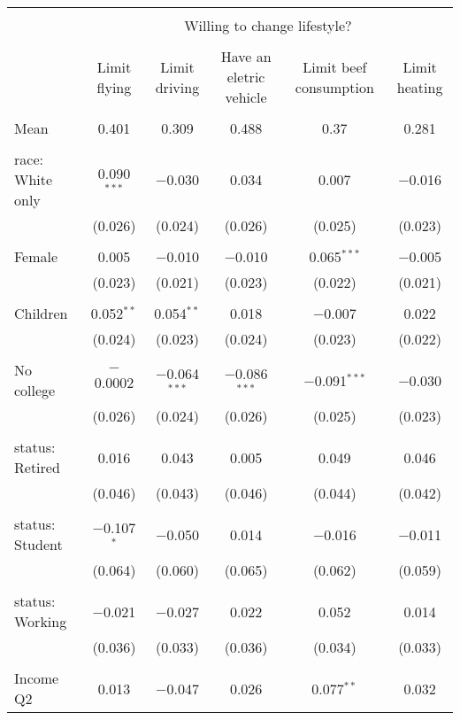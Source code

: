 
\begin{tabular}{@{\extracolsep{5pt}}lccccc} 
\\[-1.8ex]\hline 
\hline \\[-1.8ex] 
 & \multicolumn{5}{c}{Willing to change lifestyle?} \\ 
\cline{2-6} 
\\[-1.8ex] & Limit flying & Limit driving & Have an eletric vehicle & Limit beef consumption & Limit heating \\ 
\hline \\[-1.8ex] 
 Mean & 0.401 & 0.309 & 0.488 & 0.37 & 0.281  \\ \hline \\[-1.8ex] race: White only & 0.090$^{***}$ & $-$0.030 & 0.034 & 0.007 & $-$0.016 \\ 
  & (0.026) & (0.024) & (0.026) & (0.025) & (0.023) \\ 
  & & & & & \\ 
 Female & 0.005 & $-$0.010 & $-$0.010 & 0.065$^{***}$ & $-$0.005 \\ 
  & (0.023) & (0.021) & (0.023) & (0.022) & (0.021) \\ 
  & & & & & \\ 
 Children & 0.052$^{**}$ & 0.054$^{**}$ & 0.018 & $-$0.007 & 0.022 \\ 
  & (0.024) & (0.023) & (0.024) & (0.023) & (0.022) \\ 
  & & & & & \\ 
 No college & $-$0.0002 & $-$0.064$^{***}$ & $-$0.086$^{***}$ & $-$0.091$^{***}$ & $-$0.030 \\ 
  & (0.026) & (0.024) & (0.026) & (0.025) & (0.023) \\ 
  & & & & & \\ 
 status: Retired & 0.016 & 0.043 & 0.005 & 0.049 & 0.046 \\ 
  & (0.046) & (0.043) & (0.046) & (0.044) & (0.042) \\ 
  & & & & & \\ 
 status: Student & $-$0.107$^{*}$ & $-$0.050 & 0.014 & $-$0.016 & $-$0.011 \\ 
  & (0.064) & (0.060) & (0.065) & (0.062) & (0.059) \\ 
  & & & & & \\ 
 status: Working & $-$0.021 & $-$0.027 & 0.022 & 0.052 & 0.014 \\ 
  & (0.036) & (0.033) & (0.036) & (0.034) & (0.033) \\ 
  & & & & & \\ 
 Income Q2 & 0.013 & $-$0.047 & 0.026 & 0.077$^{**}$ & 0.032 \\ 

\end{tabular}
